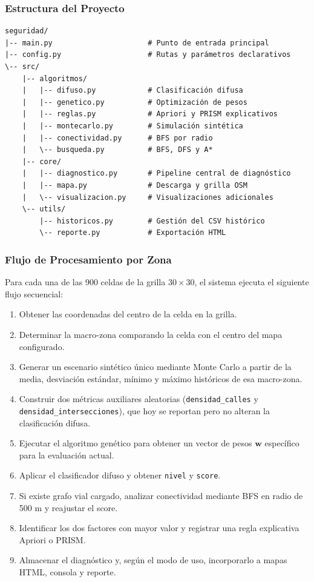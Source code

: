\documentclass[11pt]{article}
\begin{document}
\subsubsection{Estructura del Proyecto}

\begin{verbatim}
seguridad/
|-- main.py                      # Punto de entrada principal
|-- config.py                    # Rutas y parámetros declarativos
\-- src/
    |-- algoritmos/
    |   |-- difuso.py            # Clasificación difusa
    |   |-- genetico.py          # Optimización de pesos
    |   |-- reglas.py            # Apriori y PRISM explicativos
    |   |-- montecarlo.py        # Simulación sintética
    |   |-- conectividad.py      # BFS por radio
    |   \-- busqueda.py          # BFS, DFS y A*
    |-- core/
    |   |-- diagnostico.py       # Pipeline central de diagnóstico
    |   |-- mapa.py              # Descarga y grilla OSM
    |   \-- visualizacion.py     # Visualizaciones adicionales
    \-- utils/
        |-- historicos.py        # Gestión del CSV histórico
        \-- reporte.py           # Exportación HTML
\end{verbatim}

\subsubsection{Flujo de Procesamiento por Zona}

Para cada una de las 900 celdas de la grilla $30 \times 30$, el sistema ejecuta el siguiente flujo secuencial:

\begin{enumerate}
    \item Obtener las coordenadas del centro de la celda en la grilla.
    \item Determinar la macro-zona comparando la celda con el centro del mapa configurado.
    \item Generar un escenario sintético único mediante Monte Carlo a partir de la media, desviación estándar, mínimo y máximo históricos de esa macro-zona.
    \item Construir dos métricas auxiliares aleatorias (\texttt{densidad\_calles} y \texttt{densidad\_intersecciones}), que hoy se reportan pero no alteran la clasificación difusa.
    \item Ejecutar el algoritmo genético para obtener un vector de pesos $\mathbf{w}$ específico para la evaluación actual.
    \item Aplicar el clasificador difuso y obtener \texttt{nivel} y \texttt{score}.
    \item Si existe grafo vial cargado, analizar conectividad mediante BFS en radio de 500 m y reajustar el score.
    \item Identificar los dos factores con mayor valor y registrar una regla explicativa Apriori o PRISM.
    \item Almacenar el diagnóstico y, según el modo de uso, incorporarlo a mapas HTML, consola y reporte.
\end{enumerate}
\end{document}
